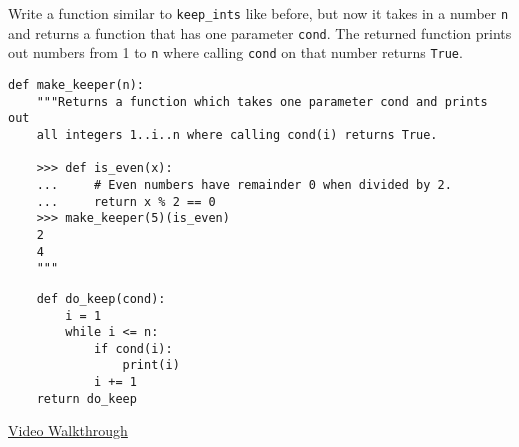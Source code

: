 \begin{blocksection}
\question Write a function similar to \lstinline$keep_ints$ like before,
but now it takes in a number \lstinline$n$ and returns a function that has
one parameter \lstinline$cond$. The returned function prints out numbers
from 1 to \lstinline$n$ where calling \lstinline$cond$ on that number
returns \lstinline$True$.

\begin{lstlisting}
def make_keeper(n):
    """Returns a function which takes one parameter cond and prints out
    all integers 1..i..n where calling cond(i) returns True.

    >>> def is_even(x):
    ...     # Even numbers have remainder 0 when divided by 2.
    ...     return x % 2 == 0
    >>> make_keeper(5)(is_even)
    2
    4
    """
\end{lstlisting}
\begin{solution}[1in]
\begin{lstlisting}
    def do_keep(cond):
        i = 1
        while i <= n:
            if cond(i):
                print(i)
            i += 1
    return do_keep
\end{lstlisting}
\href{https://youtu.be/jL5FgssAFjQ?t=2m36s}{Video Walkthrough}
\end{solution}
\end{blocksection}
